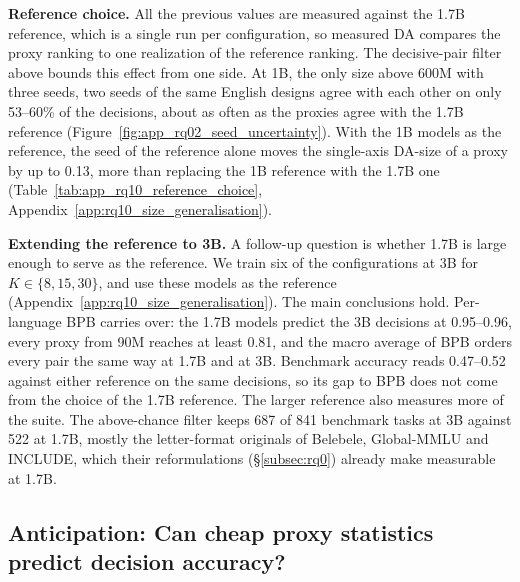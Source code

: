 \textbf{Reference choice.}
All the previous values are measured against the 1.7B reference, which  is a single run per configuration, so measured DA compares the proxy ranking to one realization of the reference ranking. The decisive-pair filter above bounds this effect from one side. At 1B, the only size above 600M with three seeds, two seeds of the same English designs agree with each other on only 53--60\% of the decisions, about as often as the proxies agree with the 1.7B reference (Figure~\ref{fig:app_rq02_seed_uncertainty}). With the 1B models as the reference, the seed of the reference alone moves the single-axis DA-size of a proxy by up to 0.13, more than replacing the 1B reference with the 1.7B one (Table~\ref{tab:app_rq10_reference_choice}, Appendix~\ref{app:rq10_size_generalisation}).

\textbf{Extending the reference to 3B.}
A follow-up question is whether 1.7B is large enough to serve as the reference. We train six of the configurations at 3B for $K \in \{8, 15, 30\}$, and use these models as the reference (Appendix~\ref{app:rq10_size_generalisation}). The main conclusions hold. Per-language BPB carries over: the 1.7B models predict the 3B decisions at 0.95--0.96, every proxy from 90M reaches at least 0.81, and the macro average of BPB orders every pair the same way at 1.7B and at 3B. Benchmark accuracy reads 0.47--0.52 against either reference on the same decisions, so its gap to BPB does not come from the choice of the 1.7B reference. The larger reference also measures more of the suite. The above-chance filter keeps 687 of 841 benchmark tasks at 3B against 522 at 1.7B, mostly the letter-format originals of Belebele, Global-MMLU and INCLUDE, which their reformulations (\S\ref{subsec:rq0}) already make measurable at 1.7B.


\subsection{Anticipation: Can cheap proxy statistics predict decision accuracy?}
\label{subsec:rq3}

